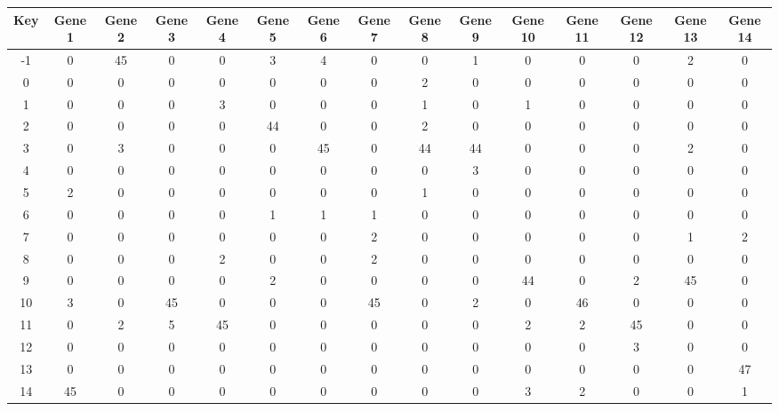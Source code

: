 \begin{tabular}{|c|c|c|c|c|c|c|c|c|c|c|c|c|c|c|}
\hline
Key & Gene 1 & Gene 2 & Gene 3 & Gene 4 & Gene 5 & Gene 6 & Gene 7 & Gene 8 & Gene 9 & Gene 10 & Gene 11 & Gene 12 & Gene 13 & Gene 14 \\
\hline
-1 & 0 & 45 & 0 & 0 & 3 & 4 & 0 & 0 & 1 & 0 & 0 & 0 & 2 & 0 \\
0 & 0 & 0 & 0 & 0 & 0 & 0 & 0 & 2 & 0 & 0 & 0 & 0 & 0 & 0 \\
1 & 0 & 0 & 0 & 3 & 0 & 0 & 0 & 1 & 0 & 1 & 0 & 0 & 0 & 0 \\
2 & 0 & 0 & 0 & 0 & 44 & 0 & 0 & 2 & 0 & 0 & 0 & 0 & 0 & 0 \\
3 & 0 & 3 & 0 & 0 & 0 & 45 & 0 & 44 & 44 & 0 & 0 & 0 & 2 & 0 \\
4 & 0 & 0 & 0 & 0 & 0 & 0 & 0 & 0 & 3 & 0 & 0 & 0 & 0 & 0 \\
5 & 2 & 0 & 0 & 0 & 0 & 0 & 0 & 1 & 0 & 0 & 0 & 0 & 0 & 0 \\
6 & 0 & 0 & 0 & 0 & 1 & 1 & 1 & 0 & 0 & 0 & 0 & 0 & 0 & 0 \\
7 & 0 & 0 & 0 & 0 & 0 & 0 & 2 & 0 & 0 & 0 & 0 & 0 & 1 & 2 \\
8 & 0 & 0 & 0 & 2 & 0 & 0 & 2 & 0 & 0 & 0 & 0 & 0 & 0 & 0 \\
9 & 0 & 0 & 0 & 0 & 2 & 0 & 0 & 0 & 0 & 44 & 0 & 2 & 45 & 0 \\
10 & 3 & 0 & 45 & 0 & 0 & 0 & 45 & 0 & 2 & 0 & 46 & 0 & 0 & 0 \\
11 & 0 & 2 & 5 & 45 & 0 & 0 & 0 & 0 & 0 & 2 & 2 & 45 & 0 & 0 \\
12 & 0 & 0 & 0 & 0 & 0 & 0 & 0 & 0 & 0 & 0 & 0 & 3 & 0 & 0 \\
13 & 0 & 0 & 0 & 0 & 0 & 0 & 0 & 0 & 0 & 0 & 0 & 0 & 0 & 47 \\
14 & 45 & 0 & 0 & 0 & 0 & 0 & 0 & 0 & 0 & 3 & 2 & 0 & 0 & 1 \\
\hline
\end{tabular}